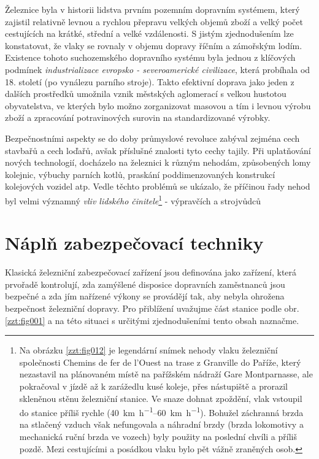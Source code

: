   {\color{black!80} Železnice byla v historii lidstva prvním pozemním dopravním systémem, který
    zajistil relativně levnou a rychlou přepravu velkých objemů zboží a velký počet cestujících na
    krátké, střední a velké vzdálenosti. S jistým zjednodušením lze konstatovat, že vlaky se rovnaly
    v objemu dopravy říčním a zámořským lodím. Existence tohoto suchozemského dopravního systému
    byla jednou z klíčových podmínek \emph{industrializace evropsko - severoamerické civilizace},
    která probíhala od 18. století (po vynálezu parního stroje). Takto efektivní doprava jako jeden
    z dalších prostředků umožnila vznik městských aglomerací s velkou hustotou obyvatelstva, ve
    kterých bylo možno zorganizovat masovou a tím i levnou výrobu zboží a zpracování potravinových
    surovin na standardizované výrobky. 

    Bezpečnostními aspekty se do doby průmyslové revoluce zabýval zejména cech stavbařů a cech
    loďařů, avšak příslušné znalosti tyto cechy tajily. Při uplatňování nových technologií,
    docházelo na železnici k různým nehodám, způsobených lomy kolejnic, výbuchy parních kotlů,
    praskání poddimenzovaných konstrukcí kolejových vozidel atp. Vedle těchto problémů se ukázalo,
    že příčinou řady nehod byl velmi významný \emph{vliv lidského činitele}\footnote{Na obrázku
    \ref{zzt:fig012} je legendární snímek nehody vlaku železniční společnosti Chemins de fer de
    l'Ouest na trase z Granville do Paříže, který nezastavil na plánovaném místě na pařížském
    nádraží Gare Montparnasse, ale pokračoval v jízdě až k zarážedlu kusé koleje, přes nástupiště a
    prorazil skleněnou stěnu železniční stanice. Ve snaze dohnat zpoždění, vlak vstoupil do stanice
    příliš rychle (\SIrange{40}{60}{\km\per\hour}). Bohužel záchranná brzda na stlačený vzduch však
    nefungovala a náhradní brzdy (brzda lokomotivy a mechanická ruční brzda ve vozech) byly použity
    na poslední chvíli a příliš pozdě. Mezi cestujícími a posádkou vlaku bylo pět vážně zraněných
    osob.}  - výpravčích a strojvůdců
   
\section{Náplň zabezpečovací techniky}
  Klasická železniční zabezpečovací zařízení jsou definována jako zařízení, která prvořadě 
  kontrolují, zda zamýšlené disposice dopravních zaměstnanců jsou bezpečné a zda jím nařízené 
  výkony se provádějí tak, aby nebyla ohrožena bezpečnost železniční dopravy. Pro přiblížení 
  uvažujme část stanice podle obr. \ref{zzt:fig001} a na této situaci s určitými zjednodušeními 
  tento obsah naznačme.

}
